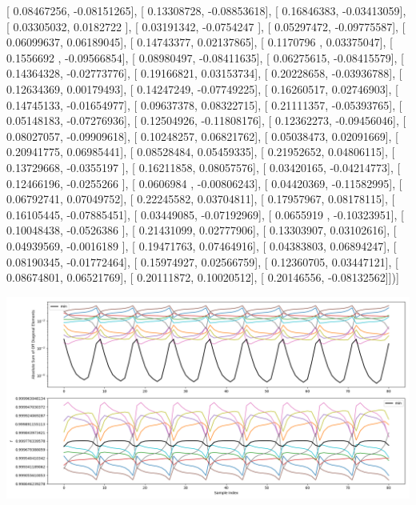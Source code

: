 \documentclass{article}
\begin{document}
       [ 0.08467256, -0.08151265],
       [ 0.13308728, -0.08853618],
       [ 0.16846383, -0.03413059],
       [ 0.03305032,  0.0182722 ],
       [ 0.03191342, -0.0754247 ],
       [ 0.05297472, -0.09775587],
       [ 0.06099637,  0.06189045],
       [ 0.14743377,  0.02137865],
       [ 0.1170796 ,  0.03375047],
       [ 0.1556692 , -0.09566854],
       [ 0.08980497, -0.08411635],
       [ 0.06275615, -0.08415579],
       [ 0.14364328, -0.02773776],
       [ 0.19166821,  0.03153734],
       [ 0.20228658, -0.03936788],
       [ 0.12634369,  0.00179493],
       [ 0.14247249, -0.07749225],
       [ 0.16260517,  0.02746903],
       [ 0.14745133, -0.01654977],
       [ 0.09637378,  0.08322715],
       [ 0.21111357, -0.05393765],
       [ 0.05148183, -0.07276936],
       [ 0.12504926, -0.11808176],
       [ 0.12362273, -0.09456046],
       [ 0.08027057, -0.09909618],
       [ 0.10248257,  0.06821762],
       [ 0.05038473,  0.02091669],
       [ 0.20941775,  0.06985441],
       [ 0.08528484,  0.05459335],
       [ 0.21952652,  0.04806115],
       [ 0.13729668, -0.0355197 ],
       [ 0.16211858,  0.08057576],
       [ 0.03420165, -0.04214773],
       [ 0.12466196, -0.0255266 ],
       [ 0.0606984 , -0.00806243],
       [ 0.04420369, -0.11582995],
       [ 0.06792741,  0.07049752],
       [ 0.22245582,  0.03704811],
       [ 0.17957967,  0.08178115],
       [ 0.16105445, -0.07885451],
       [ 0.03449085, -0.07192969],
       [ 0.0655919 , -0.10323951],
       [ 0.10048438, -0.0526386 ],
       [ 0.21431099,  0.02777906],
       [ 0.13303907,  0.03102616],
       [ 0.04939569, -0.0016189 ],
       [ 0.19471763,  0.07464916],
       [ 0.04383803,  0.06894247],
       [ 0.08190345, -0.01772464],
       [ 0.15974927,  0.02566759],
       [ 0.12360705,  0.03447121],
       [ 0.08674801,  0.06521769],
       [ 0.20111872,  0.10020512],
       [ 0.20146556, -0.08132562]])]
\begin{center}
\includegraphics[scale=.9]{report_pickled_controls172/control_dpn_all.png}

\end{center}
\end{document}
